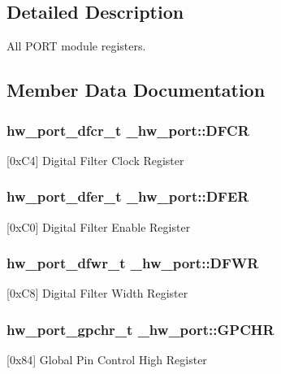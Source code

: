 \subsection{Detailed Description}
All P\+O\+RT module registers. 

\subsection{Member Data Documentation}
\subsubsection[{\texorpdfstring{D\+F\+CR}{DFCR}}]{ {\bf hw\+\_\+port\+\_\+dfcr\+\_\+t} \+\_\+hw\+\_\+port\+::\+D\+F\+CR}\hypertarget{struct__hw__port_a18a12b36c91a12fc7c448c5287ba0078}{}\label{struct__hw__port_a18a12b36c91a12fc7c448c5287ba0078}
\mbox{[}0x\+C4\mbox{]} Digital Filter Clock Register 
\subsubsection[{\texorpdfstring{D\+F\+ER}{DFER}}]{ {\bf hw\+\_\+port\+\_\+dfer\+\_\+t} \+\_\+hw\+\_\+port\+::\+D\+F\+ER}\hypertarget{struct__hw__port_a29394161f4e22165c9312a6a4573ecfe}{}\label{struct__hw__port_a29394161f4e22165c9312a6a4573ecfe}
\mbox{[}0x\+C0\mbox{]} Digital Filter Enable Register 
\subsubsection[{\texorpdfstring{D\+F\+WR}{DFWR}}]{ {\bf hw\+\_\+port\+\_\+dfwr\+\_\+t} \+\_\+hw\+\_\+port\+::\+D\+F\+WR}\hypertarget{struct__hw__port_adedf67c6ef7d710b5d501beb3ad5a0d7}{}\label{struct__hw__port_adedf67c6ef7d710b5d501beb3ad5a0d7}
\mbox{[}0x\+C8\mbox{]} Digital Filter Width Register 
\subsubsection[{\texorpdfstring{G\+P\+C\+HR}{GPCHR}}]{ {\bf hw\+\_\+port\+\_\+gpchr\+\_\+t} \+\_\+hw\+\_\+port\+::\+G\+P\+C\+HR}\hypertarget{struct__hw__port_ad965ade02f781e2e39a2653daaa7cb35}{}\label{struct__hw__port_ad965ade02f781e2e39a2653daaa7cb35}
\mbox{[}0x84\mbox{]} Global Pin Control High Register 
